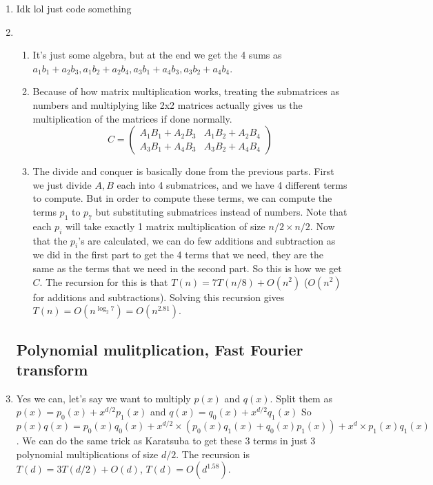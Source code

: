 \documentclass[12pt]{report}
\begin{document}
\begin{enumerate}[label=\textbf{\arabic*.}]
    \item Idk lol just code something
    
    \item
    \begin{enumerate}[label=\textbf{(\alph*)}]
        \item It's just some algebra, but at the end we get the 4 sums as $a_1 b_1 + a_2 b_3, a_1 b_2 + a_2 b_4, a_3 b_1 + a_4 b_3, a_3 b_2 + a_4 b_4$.
        \item Because of how matrix multiplication works, treating the submatrices as numbers and multiplying like 2x2 matrices actually gives us 
        the multiplication of the matrices if done normally.
        \begin{equation*}
            C = 
            \begin{pmatrix}
                A_1 B_1 + A_2 B_3 & A_1 B_2 + A_2 B_4 \\
                A_3 B_1 + A_4 B_3 & A_3 B_2 + A_4 B_4
            \end{pmatrix}
        \end{equation*}
        \item The divide and conquer is basically done from the previous parts. First we just divide $A, B$ each into 4 submatrices, and we have 4 
        different terms to compute. But in order to compute these terms, we can compute the terms $p_1$ to $p_7$ but substituting submatrices instead
        of numbers. Note that each $p_i$ will take exactly 1 matrix multiplication of size $n/2 \times n/2$. Now that the $p_i$'s are calculated, we
        can do few additions and subtraction as we did in the first part to get the 4 terms that we need, they are the same as the terms that we need
        in the second part. So this is how we get $C$. The recursion for this is that $T(n) = 7T(n/8) + O(n^2)$ ($O(n^2)$ for additions and subtractions).
        Solving this recursion gives $T(n) = O(n^{\log_2 7}) = O(n^{2.81})$.
    \end{enumerate}

    \subsection*{\Large\bfseries Polynomial mulitplication, Fast Fourier transform}

    \item Yes we can, let's say we want to multiply $p(x)$ and $q(x)$. Split them as $p(x) = p_0(x) + x^{d/2}p_1(x)$ and $q(x) = q_0(x) + x^{d/2}q_1(x)$
    So $p(x)q(x) = p_0(x)q_0(x) + x^{d/2} \times (p_0(x)q_1(x) + q_0(x)p_1(x)) + x^d \times p_1(x)q_1(x)$. We can do the same trick as Karatsuba to get
    these 3 terms in just 3 polynomial multiplications of size $d/2$. The recursion is $T(d) = 3T(d/2) + O(d)$, $T(d) = O(d^{1.58})$.


\end{enumerate}
\end{document}
